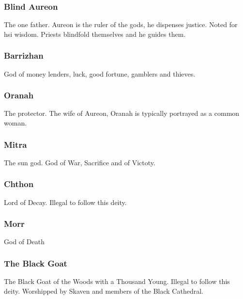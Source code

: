 \documentclass[a4paper]{style/dnd4e}
\begin{document}
\subsubsection*{Blind Aureon}
The one father.  Aureon is the ruler of the gods, he dispenses justice.
Noted for hsi wisdom.  Priests blindfold themselves and he guides them.
  

\subsubsection*{Barrizhan}
God of money lenders, luck, good fortune, gamblers and thieves.  
  

\subsubsection*{Oranah} 
The protector.  The wife of Aureon, Oranah is typically portrayed as a common woman. 
  

\subsubsection*{Mitra}
The sun god.  God of War, Sacrifice and of Victoty.


\subsubsection*{Chthon}
Lord of Decay.    
Illegal to follow this deity.


\subsubsection*{Morr}
God of Death    


\subsubsection*{The Black Goat}   
The Black Goat of the Woods with a Thousand Young.  Illegal to follow this deity.
Worshipped by Skaven and members of the Black Cathedral.
\end{document}
